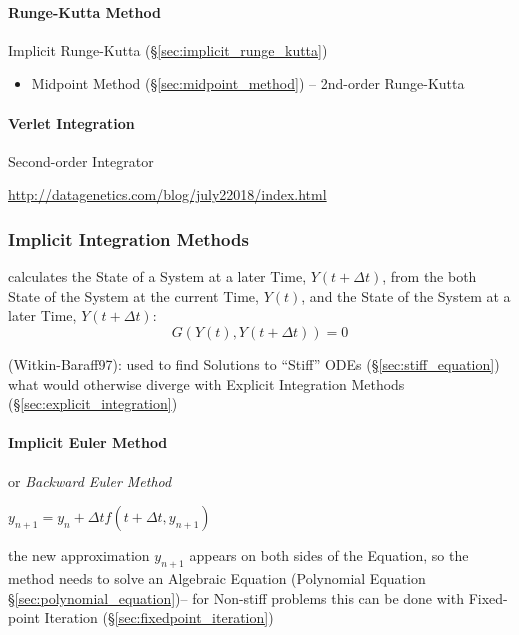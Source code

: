 \paragraph{Runge-Kutta Method}\label{sec:runge_kutta}\hfill

\fist Implicit Runge-Kutta (\S\ref{sec:implicit_runge_kutta})

\begin{itemize}
  \item Midpoint Method (\S\ref{sec:midpoint_method}) -- 2nd-order Runge-Kutta
\end{itemize}



\paragraph{Verlet Integration}\label{sec:verlet_integration}\hfill

Second-order Integrator

\url{http://datagenetics.com/blog/july22018/index.html}



\subsubsection{Implicit Integration Methods}\label{sec:implicit_integration}

calculates the State of a System at a later Time, $Y(t + \Delta{t})$, from the
both State of the System at the current Time, $Y(t)$, and the State of the
System at a later Time, $Y(t + \Delta{t})$:
\[
  G(Y(t), Y(t + \Delta{t})) = 0
\]

(Witkin-Baraff97): used to find Solutions to ``Stiff'' ODEs
(\S\ref{sec:stiff_equation}) what would otherwise diverge with Explicit
Integration Methods (\S\ref{sec:explicit_integration})



\paragraph{Implicit Euler Method}\label{sec:implicit_euler}\hfill

or \emph{Backward Euler Method}

$y_{n+1} = y_n + \Delta{t}f(t + \Delta{t}, y_{n+1})$

the new approximation $y_{n+1}$ appears on both sides of the Equation, so the
method needs to solve an Algebraic Equation (Polynomial Equation
\S\ref{sec:polynomial_equation})-- for Non-stiff problems this can be done with
Fixed-point Iteration (\S\ref{sec:fixedpoint_iteration})

